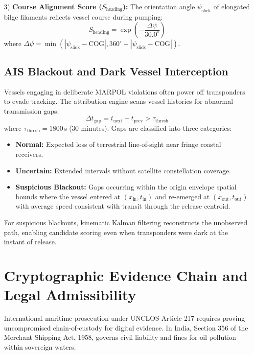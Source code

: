\documentclass[conference]{IEEEtran}
\begin{document}
3) \textbf{Course Alignment Score ($S_{\text{heading}}$):}
The orientation angle $\psi_{\text{slick}}$ of elongated bilge filaments reflects vessel course during pumping:
\begin{equation}
S_{\text{heading}} = \exp\left(-\frac{\Delta\psi}{30.0^\circ}\right)
\label{eq:heading_score}
\end{equation}
where $\Delta\psi = \min(|\psi_{\text{slick}} - \text{COG}|, 360^\circ - |\psi_{\text{slick}} - \text{COG}|)$.

\subsection{AIS Blackout and Dark Vessel Interception}
Vessels engaging in deliberate MARPOL violations often power off transponders to evade tracking. The attribution engine scans vessel histories for abnormal transmission gaps:
\begin{equation}
\Delta t_{\text{gap}} = t_{\text{next}} - t_{\text{prev}} > \tau_{\text{thresh}}
\label{eq:ais_gap}
\end{equation}
where $\tau_{\text{thresh}} = 1800$\,s (30 minutes). Gaps are classified into three categories:
\begin{itemize}
    \item \textbf{Normal:} Expected loss of terrestrial line-of-sight near fringe coastal receivers.
    \item \textbf{Uncertain:} Extended intervals without satellite constellation coverage.
    \item \textbf{Suspicious Blackout:} Gaps occurring within the origin envelope spatial bounds where the vessel entered at $(x_{\text{in}}, t_{\text{in}})$ and re-emerged at $(x_{\text{out}}, t_{\text{out}})$ with average speed consistent with transit through the release centroid.
\end{itemize}
For suspicious blackouts, kinematic Kalman filtering reconstructs the unobserved path, enabling candidate scoring even when transponders were dark at the instant of release.

\section{Cryptographic Evidence Chain and Legal Admissibility}

International maritime prosecution under UNCLOS Article 217 requires proving uncompromised chain-of-custody for digital evidence. In India, Section 356 of the Merchant Shipping Act, 1958, governs civil liability and fines for oil pollution within sovereign waters.
\end{document}
